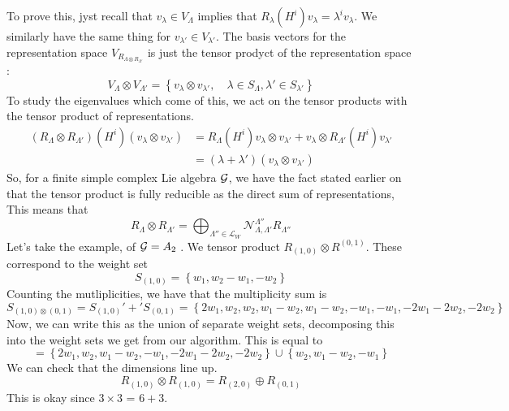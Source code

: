 To prove this, jyst recall that $ v _{ \lambda } \in V_{ \Lambda } $ 
implies that $ R _{ \lambda } \left( H ^ i  \right)  v _ \lambda  = \lambda ^ i v _{ \lambda } $. We similarly have the same thing for $ v _{ \lambda ' } \in V _{ \lambda ' } $. 
The basis vectors for the 
representation space $ V_{ R_{ \Lambda \otimes R _{ \Lambda ' } } } $ 
is just the tensor prodyct of the representation space : 
\[
 V _{ \Lambda } \otimes V _{ \Lambda ' }  = 
 \left\{  v _ \lambda \otimes v _{ \lambda ' } , \quad 
 \lambda \in S _{ \Lambda } , \lambda ' \in S _{ \lambda ' } \right\}  
\] To study the eigenvalues which come 
of this, we act on the tensor products with 
the tensor product of representations. 
\begin{align*}
	\left( R _{ \Lambda } \otimes R _{ \Lambda ' }  \right)  \left( H ^ i  \right)  
	\left( v _{ \lambda } \otimes v _{ \lambda ' }  \right)  &=  
	R _{ \Lambda } \left( H ^ i  \right)  v _{ \lambda } \otimes v _{ \lambda ' } 
	+ v _{ \lambda } \otimes R_{ \Lambda  ' } \left( H ^ i  \right)  v _{ \lambda ' } \\
								 &=  \left( \lambda + \lambda '  \right)  \left( v _{ \lambda  } \otimes v _{\lambda ' }  \right)  
\end{align*}
So, for a finite 
simple complex Lie algebra $ \mathcal{ G } $, 
we have the fact stated earlier on that 
the tensor product is fully reducible as 
the direct sum of representations, 
This means that 
\[
 R _{ \Lambda } \otimes R _{ \Lambda  ' }  = 
 \bigoplus_{ \Lambda '' \in \mathcal{ L } _ W } \mathcal{ N } _{ \Lambda , \Lambda  ' } ^{ \Lambda '' } R _{ \Lambda '' } 
\] Let's take the example, of $ \mathcal{ G }  = A _ 2 $ . 
We tensor product $ R _{ \left( 1, 0  \right)  } \otimes R^{ \left( 0 ,1  \right)  } $. 
These  correspond to the weight set 
\[
	S _{ \left( 1, 0  \right)  }  = \left\{  w _ 1 , w_ 2 - w _ 1 , - w _ 2  \right\}  
\] Counting the mutliplicities, 
we have that the multiplicity sum is 
\[
	S _{ \left( 1, 0  \right)  \otimes \left( 0 , 1  \right)  }  = 
	S_{ \left( 1, 0  \right)  } ' + ' S _{ \left( 0 , 1  \right)  } 
	 = \left\{  2 w _ 1 , w _ 2, w_ 2 , w _ 1 - w _ 2, 
	 w _ 1  - w _ 2 , - w _ 1, - w_ 1 , - 2 w_ 1 - 2 w_ 2 , -  2w _ 2 \right\} 
\] Now, we can write this as the union of 
separate weight sets, decomposing this into 
the weight sets we get from our algorithm. 
This is equal to 
\[
 =  \left\{  2 w_ 1 , w _ 2, w_ 1 - w _ 2, - w_ 1, - 2 w _ 1 - 2 w _ 2,  - 2 w_ 2  \right\}  
 \cup \left\{  w_ 2, w _ 1 - w _ 2 , - w _ 1  \right\} 
\] We can check that the dimensions line up. 
\[
	R_{ \left( 1, 0  \right)  } \otimes R_{ \left( 1, 0  \right)  }  = R _{ \left( 2, 0  \right)  } \oplus R _{ \left( 0 , 1  \right)  }
\] This is okay since $ 3 \times 3 $ = $ 6 + 3 $. 

